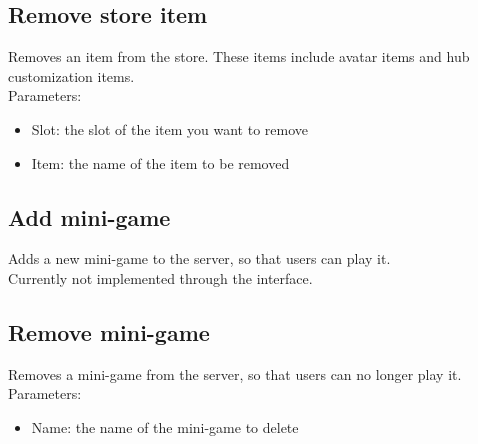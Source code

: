 \documentclass[a4paper,12pt]{article}
\begin{document}
\subsection*{Remove store item}
Removes an item from the store. These items include avatar items and hub customization items.\\
Parameters:
\begin{itemize}
	\setlength\itemsep{0em}
	\item Slot: the slot of the item you want to remove
	\item Item: the name of the item  to be removed
\end{itemize}	

\subsection*{Add mini-game}
Adds a new mini-game to the server, so that users can play it.\\
Currently not implemented through the interface.\\

\subsection*{Remove mini-game}
Removes a mini-game from the server, so that users can no longer play it.
Parameters:
\begin{itemize}
	\setlength\itemsep{0em}
	\item Name: the name of the mini-game to delete
\end{itemize}		
\end{document}
